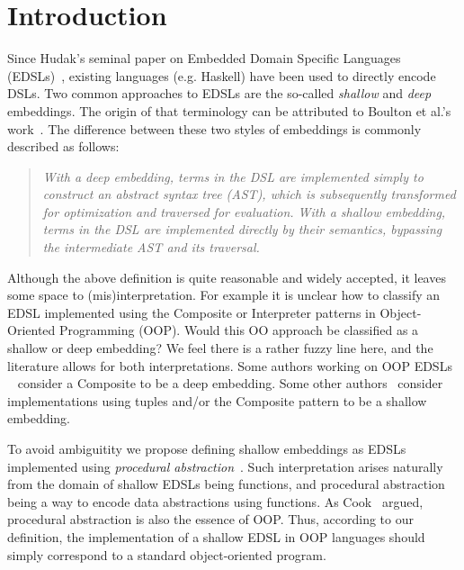 \section{Introduction}

Since Hudak's seminal paper on Embedded Domain Specific Languages (EDSLs)~\cite{hudak1998modular}, existing
languages (e.g. Haskell) have been used to directly encode
DSLs. Two common approaches to EDSLs are the so-called \emph{shallow}
and \emph{deep} embeddings. The origin of that terminology can be
attributed to Boulton et al.'s work~\cite{Boulton92dsl}. The difference between these
two styles of embeddings is commonly described as follows:

\begin{quote}
\emph{With a deep embedding, terms in the DSL are implemented simply to
construct an abstract syntax tree (AST), which is subsequently
transformed for optimization and traversed for evaluation. With a
shallow embedding, terms in the DSL are implemented directly by
their semantics, bypassing the intermediate AST and its traversal.}\cite{gibbons2014folding}
\end{quote}


\noindent Although the above definition is quite reasonable and widely accepted,
it leaves some space to (mis)interpretation. For example it is unclear 
how to classify an EDSL implemented using the {\sc Composite} or {\sc Interpreter} 
patterns in Object-Oriented Programming (OOP). Would this OO approach be
classified as a shallow or deep embedding? We feel there is a rather
fuzzy line here, and the literature allows for both interpretations. Some authors working on
OOP EDSLs ~\cite{} consider a {\sc Composite} to be a deep
embedding. Some other authors~\cite{gibbons2014folding} 
consider implementations using tuples and/or the  {\sc Composite}
pattern to be a shallow embedding.  


To avoid ambiguitity we propose defining shallow embeddings as EDSLs implemented using \emph{procedural abstraction}~\cite{reynolds94proceduralabstraction}. Such
interpretation arises naturally from the domain of shallow EDSLs being
functions, and procedural abstraction being a way to encode
data abstractions using functions. As Cook~\cite{cook09abstraction} argued,
procedural abstraction is also the essence of OOP.
Thus, according to our definition, the implementation of a shallow
EDSL in OOP languages should simply correspond to a standard
object-oriented program. 

